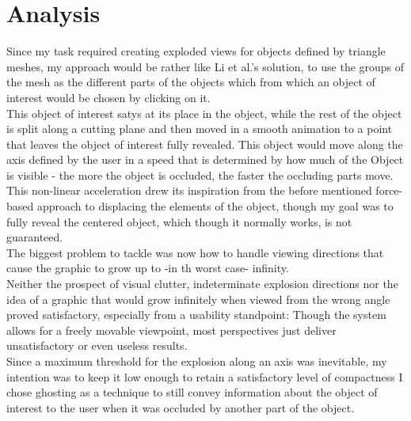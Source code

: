 \section{Analysis}
Since my task required creating exploded views for objects defined by triangle meshes, my approach would be rather like Li et al.'s solution, to use the groups of the mesh as the different parts of the objects which from which an object of interest would be chosen by clicking on it.\\ 
This object of interest satys at its place in the object, while the rest of the object is split along a cutting plane and then moved in a smooth animation to a point that leaves the object of interest fully revealed. This object would move along the axis defined by the user in a speed that is determined by how much of the Object is visible - the more the object is occluded, the faster the occluding parts move. This non-linear acceleration drew its inspiration from the before mentioned force-based approach to displacing the elements of the object, though my goal was to fully reveal the centered object, which though it normally works, is not guaranteed.\\
The biggest problem to tackle was now how to handle viewing directions that cause the graphic to grow up to -in th worst case- infinity.\\
Neither the prospect of visual clutter, indeterminate explosion directions nor the idea of a graphic that would grow infinitely when viewed from the wrong angle proved satisfactory, especially from a usability standpoint: Though the system allows for a freely movable viewpoint, most perspectives just deliver unsatisfactory or even useless results.\\
Since a maximum threshold for the explosion along an axis was inevitable, my intention was to keep it low enough to retain a satisfactory level of compactness I chose ghosting as a technique to still convey information about the object of interest to the user when it was occluded by another part of the object.\\



